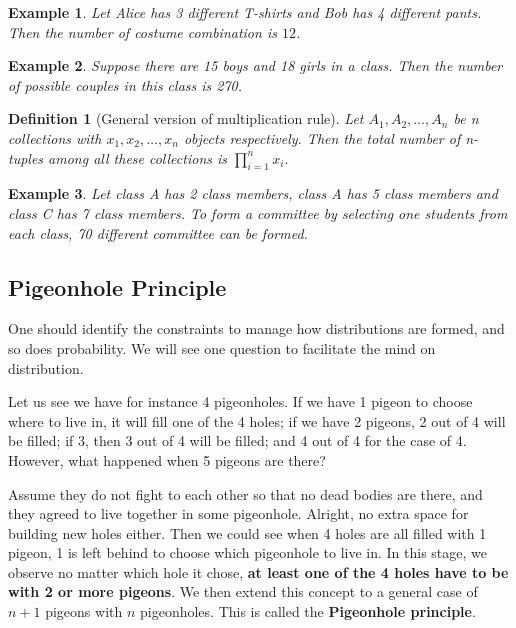 \documentclass[12pt]{article}
\newtheorem{definition}{Definition}[section]
\newtheorem*{example}{Example}
\begin{document}
    \begin{example}
        Let Alice has 3 different T-shirts and Bob has 4 different pants. Then the number of costume combination is $12$.
    \end{example}
    
    \begin{example}
        Suppose there are 15 boys and 18 girls in a class. Then the number of possible couples in this class is 270.
    \end{example}

    \begin{definition}[General version of multiplication rule]
        Let $A_1,A_2,\dots,A_n$ be n collections with $x_1,x_2,\dots,x_n$ objects respectively. Then the total number of n-tuples among all these collections is $\displaystyle \prod_{i=1}^{n}x_i$. 
    \end{definition}

    \begin{example}
        Let class A has 2 class members, class A has 5 class members and class C has 7 class members. To form a committee by selecting one students from each class, 70 different committee can be formed.
    \end{example}

    \subsection{Pigeonhole Principle}

    One should identify the constraints to manage how distributions are formed, and so does probability. We will see one question to facilitate the mind on distribution.

    Let us see we have for instance 4 pigeonholes. If we have 1 pigeon to choose where to live in, it will fill one of the 4 holes; if we have 2 pigeons, 2 out of 4 will be filled; if 3, then 3 out of 4 will be filled; and 4 out of 4 for the case of 4. However, what happened when 5 pigeons are there?
    
    Assume they do not fight to each other so that no dead bodies are there, and they agreed to live together in some pigeonhole. Alright, no extra space for building new holes either. Then we could see when 4 holes are all filled with 1 pigeon, 1 is left behind to choose which pigeonhole to live in. In this stage, we observe no matter which hole it chose, \textbf{at least one of the 4 holes have to be with 2 or more pigeons}. We then extend this concept to a general case of $n+1$ pigeons with $n$ pigeonholes. This is called the \textbf{Pigeonhole principle}.
\end{document}
